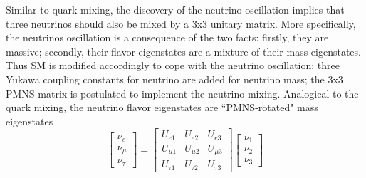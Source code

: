 \noindent Similar to quark mixing, the discovery of the neutrino oscillation implies that three neutrinos should also be mixed by a 3x3 unitary matrix. More specifically, the neutrinos oscillation is a consequence of the two facts: firstly, they are massive; secondly, their flavor eigenstates are a mixture of their mass eigenstates. Thus SM is modified accordingly to cope with the neutrino oscillation: three Yukawa coupling constants for neutrino are added for neutrino mass; the 3x3 PMNS matrix is postulated to implement the neutrino mixing. Analogical to the quark mixing, the neutrino flavor eigenstates are ``PMNS-rotated" mass eigenstates
\begin{equation}
    \begin{bmatrix}
        \nu_e \\ \nu_\mu \\ \nu_\tau 
    \end{bmatrix} = 
     \begin{bmatrix}
        U_{e1} & U_{e2} & U_{e3} \\ U_{\mu 1} & U_{\mu 2} & U_{\mu 3} \\ U_{\tau 1} & U_{\tau 2} & U_{\tau 3}
    \end{bmatrix}   
    \begin{bmatrix}
        \nu_1 \\ \nu_2 \\ \nu_3
    \end{bmatrix}
\end{equation}

